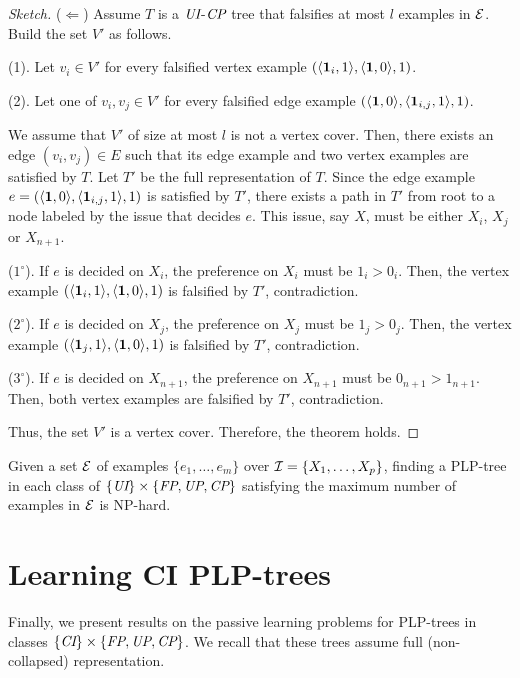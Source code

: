 \begin{proof}[Sketch]
\noindent ($\Leftarrow$) Assume $T$ is a $\textit{UI}$-$\textit{CP}$ tree that falsifies at most $l$
examples in $\mathcal{E}$. Build the set $V'$ as follows.

(1). Let $v_i \in V'$ for every falsified vertex example $(\mathit{\langle} \textbf{1}_i,1 \mathit{\rangle}, \mathit{\langle} \textbf{1},0 \mathit{\rangle}, 1)$.

(2). Let one of $v_i, v_j \in V'$ for every falsified edge example 
$(\mathit{\langle} \textbf{1},0 \mathit{\rangle}, \mathit{\langle} \textbf{1}_{i,j},1 \mathit{\rangle}, 1)$.

We assume that $V'$ of size at most $l$ is not a vertex cover. 
Then, there exists an edge $(v_i,v_j) \in E$ such that its edge example and
two vertex examples are satisfied by $T$.
Let $T'$ be the full representation of $T$.
Since the edge example $e=(\mathit{\langle} \textbf{1},0 \mathit{\rangle}, \mathit{\langle} \textbf{1}_{i,j},1 \mathit{\rangle}, 1)$ is
satisfied by $T'$, there exists a path in $T'$ from root to a node labeled by
the issue that decides $e$. This issue, say $X$, must be either $X_i$, $X_j$ or $X_{n+1}$.

\noindent ($1^\circ$). If $e$ is decided on $X_i$, the preference on $X_i$ must be
$1_i>0_i$. Then, the vertex example $(\mathit{\langle} \textbf{1}_i,1 \mathit{\rangle}, \mathit{\langle} \textbf{1},0 \mathit{\rangle}, 1)$ is
falsified by $T'$, contradiction.

\noindent ($2^\circ$). If $e$ is decided on $X_j$, the preference on $X_j$ must be
$1_j>0_j$. Then, the vertex example $(\mathit{\langle} \textbf{1}_j,1 \mathit{\rangle}, \mathit{\langle} \textbf{1},0 \mathit{\rangle}, 1)$ is
falsified by $T'$, contradiction.

\noindent ($3^\circ$). If $e$ is decided on $X_{n+1}$, the preference on
$X_{n+1}$ must be $0_{n+1}>1_{n+1}$. Then, both vertex examples are falsified
by $T'$, contradiction.

Thus, the set $V'$ is a vertex cover. Therefore, the theorem holds.
\end{proof}

\begin{cor}
\label{cor:UIFP_least}
Given a set $\mathcal{E}$ of examples $\{e_1,\ldots,e_m\}$ over 
$\mathcal{I}=\{X_1,\ldots,X_p\}$, finding a PLP-tree in each class of $\{\textit{UI}\} \times \{\textit{FP},\textit{UP},\textit{CP}\}$ 
satisfying the maximum number of examples in $\mathcal{E}$ is NP-hard.
\end{cor}

\section{Learning CI PLP-trees}
Finally, we present results on the passive learning problems for 
PLP-trees in classes $\{\textit{CI}\} \times \{\textit{FP},\textit{UP},\textit{CP}\}$. We recall that these
trees assume full (non-collapsed) representation.


